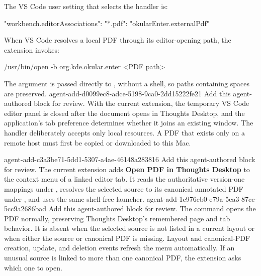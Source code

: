 The VS Code user setting that selects the handler is:
\begin{DocCode}
"workbench.editorAssociations": {
  "*.pdf": "okularEnter.externalPdf"
}
\end{DocCode}
When VS Code resolves a local PDF through its editor-opening path, the extension invokes:
\begin{DocCode}
/usr/bin/open -b org.kde.okular.enter <PDF path>
\end{DocCode}
The argument is passed directly to , without a shell, so paths containing spaces are preserved.
\agentProposedEdit
  {agent-add-d0099ec8-adce-5198-9ca0-2dd15222fe21}
  {Add this agent-authored block for review.}
  {}
  {With the current extension, the temporary VS Code editor panel is closed after the document opens in Thoughts Desktop, and the application's tab preference determines whether it joins an existing window.}
The handler deliberately accepts only local  resources.
A PDF that exists only on a remote host must first be copied or downloaded to this Mac.

\agentProposedEdit
  {agent-add-c3a3be71-5dd1-5307-a4ae-46148a283816}
  {Add this agent-authored block for review.}
  {}
  {The current extension adds \textbf{Open PDF in Thoughts Desktop} to the context menu of a linked  editor tab.}
It reads the authoritative version-one mappings under , resolves the selected source to its canonical annotated PDF under , and uses the same shell-free launcher.
\agentProposedEdit
  {agent-add-1c976eb0-e79a-5ea3-87cc-5cc9a2686bad}
  {Add this agent-authored block for review.}
  {}
  {The command opens the PDF normally, preserving Thoughts Desktop's remembered page and tab behavior.}
It is absent when the selected source is not listed in a current layout or when either the source or canonical PDF is missing.
Layout and canonical-PDF creation, update, and deletion events refresh the menu automatically.
If an unusual source is linked to more than one canonical PDF, the extension asks which one to open.

